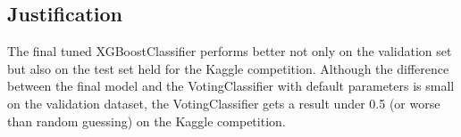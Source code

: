 \subsection{Justification}

The final tuned XGBoostClassifier performs better not only on the validation set but also on the test set held for the Kaggle competition. Although the difference between the final model and the VotingClassifier with default parameters is small on the validation dataset, the VotingClassifier gets a result under 0.5 (or worse than random guessing) on the Kaggle competition.